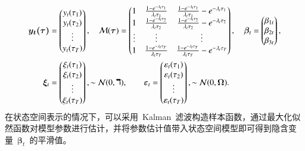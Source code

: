 \begin{align*}
\bm{y_t(\tau)} &=
  \begin{pmatrix}
    y_t(\tau_1) \\
    y_t(\tau_2) \\
    \vdots \\
    y_t(\tau_T) \\
  \end{pmatrix},\quad
  \mathcal{\bm{M}}(\bm{\tau}) =
  \begin{pmatrix}
    1 & \frac{1-e^{-\lambda_{t} \tau_1}} {\lambda_{t} \tau_1} & \frac{1-e^{-\lambda_{t} \tau_1}} {\lambda_{t} \tau_1} - e^{-\lambda_{t} \tau_1} \\
    1 & \frac{1-e^{-\lambda_{t} \tau_2}} {\lambda_{t} \tau_2} & \frac{1-e^{-\lambda_{t} \tau_2}} {\lambda_{t} \tau_2} - e^{-\lambda_{t} \tau_2} \\
\vdots    & \vdots &  \vdots\\
    1 & \frac{1-e^{-\lambda_{t} \tau_T}} {\lambda_{t} \tau_T} & \frac{1-e^{-\lambda_{t} \tau_T}} {\lambda_{t} \tau_T} - e^{-\lambda_{t} \tau_T} \\
  \end{pmatrix},\quad
   \bm{\beta}_t =
  \begin{pmatrix}
    \beta_{1t} \\
    \beta_{2t} \\
    \beta_{3t} \\
  \end{pmatrix},\\
 \bm{\xi}_t &=
    \begin{pmatrix}
    \xi_{t}(\tau_1) \\
    \xi_{t} (\tau_2)\\
    \vdots                  \\
    \xi_{t}(\tau_T) \\
  \end{pmatrix},\sim \mathcal{N}(0,\bm{\daleth}),\qquad
 \bm{\varepsilon}_t =
    \begin{pmatrix}
    \varepsilon_{t}(\tau_1) \\
    \varepsilon_{t} (\tau_2)\\
    \vdots                  \\
    \varepsilon_{t}(\tau_T) \\
  \end{pmatrix},\sim \mathcal{N}(0,\bm{\Omega}).
\end{align*}
在状态空间表示的情况下，可以采用~Kalman~滤波构造样本函数，通过最大化似然函数对模型参数进行估计，并将参数估计值带入状态空间模型即可得到隐含变量~$\bm{\beta}_t$~的平滑值。

